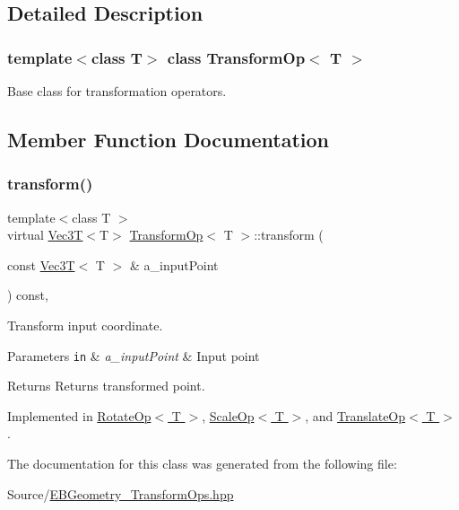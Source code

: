 \subsection{Detailed Description}
\subsubsection*{template$<$class T$>$\newline
class Transform\+Op$<$ T $>$}

Base class for transformation operators. 

\subsection{Member Function Documentation}
\mbox{\label{classTransformOp_a61c1920daa9f55fd2ea9095cbcfa18b8}} 
\subsubsection{\texorpdfstring{transform()}{transform()}}
{\footnotesize\ttfamily template$<$class T $>$ \\
virtual \hyperlink{classVec3T}{Vec3T}$<$T$>$ \hyperlink{classTransformOp}{Transform\+Op}$<$ T $>$\+::transform (\begin{DoxyParamCaption}\item[{const \hyperlink{classVec3T}{Vec3T}$<$ T $>$ \&}]{a\+\_\+input\+Point }\end{DoxyParamCaption}) const\hspace{0.3cm}{\ttfamily [pure virtual]}, {\ttfamily [noexcept]}}



Transform input coordinate. 


\begin{DoxyParams}[1]{Parameters}
\mbox{\tt in}  & {\em a\+\_\+input\+Point} & Input point \\
\hline
\end{DoxyParams}
\begin{DoxyReturn}{Returns}
Returns transformed point. 
\end{DoxyReturn}


Implemented in \hyperlink{classRotateOp_aaffc25806ef6b9d7ea6651aa2bb9767c}{Rotate\+Op$<$ T $>$}, \hyperlink{classScaleOp_ac09e64516daa1b75111bd36dedfeeda9}{Scale\+Op$<$ T $>$}, and \hyperlink{classTranslateOp_a16941d9e52b02d39f9c92f6b23f61af6}{Translate\+Op$<$ T $>$}.



The documentation for this class was generated from the following file\+:\begin{DoxyCompactItemize}
\item 
Source/\hyperlink{EBGeometry__TransformOps_8hpp}{E\+B\+Geometry\+\_\+\+Transform\+Ops.\+hpp}\end{DoxyCompactItemize}
